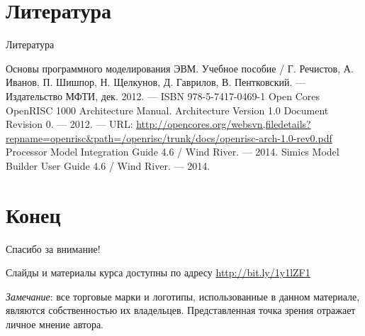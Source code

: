 \documentclass{beamer}
\begin{document}
\section{Литература}

\begin{frame}[allowframebreaks]{Литература}
\begin{thebibliography}{99}
     Основы программного моделирования ЭВМ. Учебное пособие / Г. Речистов, А. Иванов, П. Шишпор, Н. Щелкунов, Д. Гаврилов, В. Пентковский. — Издательство МФТИ, дек. 2012. — ISBN 978-5-7417-0469-1
	  Open Cores OpenRISC 1000 Architecture Manual. Architecture Version 1.0 Document Revision 0. — 2012. — URL: \url{http://opencores.org/websvn,filedetails?repname=openrisc&path=/openrisc/trunk/docs/openrisc-arch-1.0-rev0.pdf}
	 Processor Model Integration Guide 4.6 / Wind River. — 2014.
	 Simics Model Builder User Guide 4.6 / Wind River. — 2014.
	
\end{thebibliography}
\end{frame}


\section{Конец}
\begin{frame}

{\huge{Спасибо за внимание!}\par}

\vfill

Слайды и материалы курса доступны по адресу \url{http://bit.ly/1y1lZF1} %

\vfill

\tiny{\textit{Замечание}: все торговые марки и логотипы, использованные в данном материале, являются собственностью их владельцев. Представленная точка зрения отражает личное мнение автора.
}

\end{frame}

\end{document}
